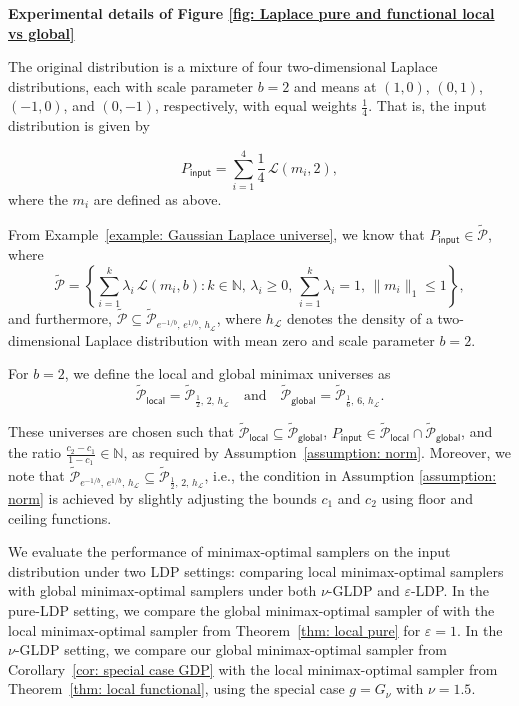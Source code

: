 \documentclass[accepted]{article}
\theoremstyle{plain} %
\theoremstyle{definition}
\theoremstyle{remark}
\begin{document}
\textbf{Experimental details of Figure \ref{fig: Laplace pure and functional local vs global}}




The original distribution is a mixture of four two-dimensional Laplace distributions, each with scale parameter \( b = 2 \) and means at \( (1,0) \), \( (0,1) \), \( (-1,0) \), and \( (0,-1) \), respectively, with equal weights \( \frac{1}{4} \). That is, the input distribution is given by

\[
P_{\textsf{input}} = \sum_{i=1}^4 \frac{1}{4} \, \mathcal{L}(m_i, 2),
\]
where the \( m_i \) are defined as above.

From Example~\ref{example: Gaussian Laplace universe}, we know that \( P_{\textsf{input}} \in \tilde{\mathcal{P}} \), where
\[
\tilde{\mathcal{P}} = \left\{ \sum_{i=1}^k \lambda_i \, \mathcal{L}(m_i, b) : k \in \mathbb{N},\, \lambda_i \geq 0,\, \sum_{i=1}^k \lambda_i = 1,\, \|m_i\|_1 \leq 1 \right\},
\]
and furthermore, \( \tilde{\mathcal{P}} \subseteq \tilde{\mathcal{P}}_{e^{-1/b},\, e^{1/b},\, h_{\mathcal{L}}} \), where \( h_{\mathcal{L}} \) denotes the density of a two-dimensional Laplace distribution with mean zero and scale parameter \( b = 2 \).

For \( b = 2 \), we define the local and global minimax universes as
\[
\tilde{\mathcal{P}}_{\textsf{local}} = \tilde{\mathcal{P}}_{\frac{1}{2},\, 2,\, h_{\mathcal{L}}}
\quad \text{and} \quad
\tilde{\mathcal{P}}_{\textsf{global}} = \tilde{\mathcal{P}}_{\frac{1}{6},\, 6,\, h_{\mathcal{L}}}.
\]

These universes are chosen such that \( \tilde{\mathcal{P}}_{\textsf{local}} \subseteq \tilde{\mathcal{P}}_{\textsf{global}} \), \( P_{\textsf{input}} \in \tilde{\mathcal{P}}_{\textsf{local}} \cap \tilde{\mathcal{P}}_{\textsf{global}} \),  and the ratio \( \frac{c_2 - c_1}{1 - c_1} \in \mathbb{N} \), as required by Assumption~\ref{assumption: norm}.
Moreover, we note that \( \tilde{\mathcal{P}}_{e^{-1/b},\, e^{1/b},\, h_{\mathcal{L}}} \subseteq \tilde{\mathcal{P}}_{\frac{1}{2},\, 2,\, h_{\mathcal{L}}} \), i.e., the condition in Assumption \ref{assumption: norm} is achieved by slightly adjusting the bounds \( c_1 \) and \( c_2 \) using floor and ceiling functions.

We evaluate the performance of minimax-optimal samplers on the input distribution under two LDP settings: comparing local minimax-optimal samplers with global minimax-optimal samplers under both \( \nu \)-GLDP and \( \varepsilon \)-LDP. In the pure-LDP setting, we compare the global minimax-optimal sampler of \citet{park2024exactly} with the local minimax-optimal sampler from Theorem~\ref{thm: local pure} for \( \varepsilon = 1 \). In the \( \nu \)-GLDP setting, we compare our global minimax-optimal sampler from Corollary~\ref{cor: special case GDP} with the local minimax-optimal sampler from Theorem~\ref{thm: local functional}, using the special case \( g = G_\nu \) with \( \nu = 1.5 \).
\end{document}
